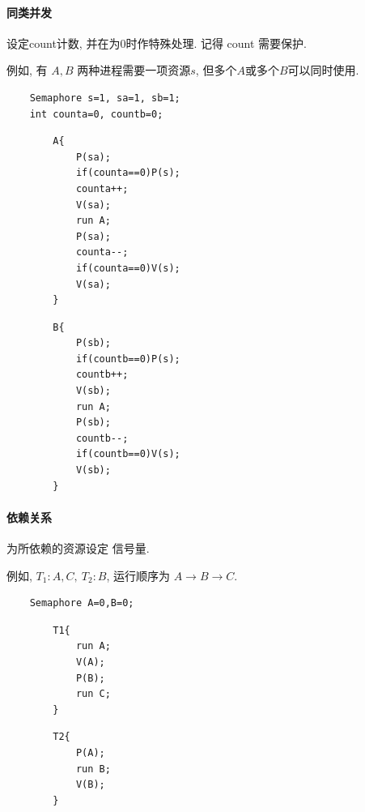 \paragraph{同类并发}设定count计数, 并在为0时作特殊处理. 记得 count 需要保护. 

例如, 有 $A, B$ 两种进程需要一项资源$s$, 但多个$A$或多个$B$可以同时使用.
\begin{verbatim}
    Semaphore s=1, sa=1, sb=1;
    int counta=0, countb=0;
\end{verbatim}
\vspace{-\medskipamount}
\vspace{-2\baselineskip}
\vspace{0.4pt}
\begin{multicols}{2}
    \begin{verbatim}
        A{
            P(sa);
            if(counta==0)P(s);
            counta++;
            V(sa);
            run A;
            P(sa);
            counta--;
            if(counta==0)V(s);
            V(sa);
        }
    \end{verbatim}
    \columnbreak
    \begin{verbatim}
        B{
            P(sb);
            if(countb==0)P(s);
            countb++;
            V(sb);
            run A;
            P(sb);
            countb--;
            if(countb==0)V(s);
            V(sb);
        }
    \end{verbatim}
\end{multicols}


\paragraph{依赖关系}为所依赖的资源设定 信号量. 

例如, $T_1: A, C,\ T_2: B$, 运行顺序为 $A\to B\to C$. 
\begin{verbatim}
    Semaphore A=0,B=0;
\end{verbatim}
\vspace{-\medskipamount}
\vspace{-2\baselineskip}
\vspace{0.4pt}

\begin{multicols}{2}
    \begin{verbatim}
        T1{       
            run A;
            V(A); 
            P(B); 
            run C;
        }
    \end{verbatim}
    \columnbreak
    \begin{verbatim}
        T2{
            P(A);
            run B;
            V(B);
        }
    \end{verbatim}
\end{multicols}



